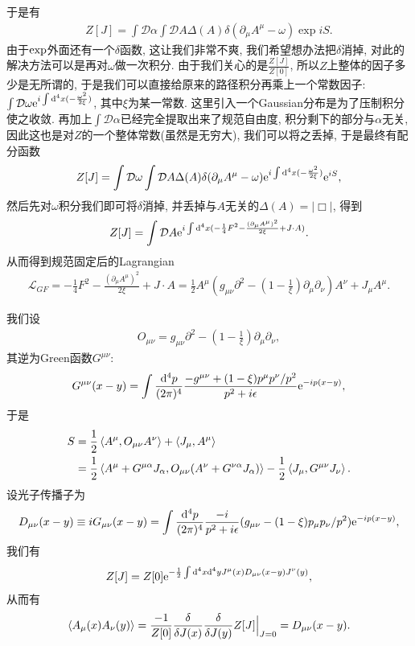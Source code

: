 于是有
\begin{align}
    Z[J]=\int\mathcal D\alpha\int\mathcal DA\Delta(A)\delta(\partial_\mu A^\mu-\omega)\exp{iS}.
\end{align}
由于$\rm{exp}$外面还有一个$\delta$函数, 这让我们非常不爽, 我们希望想办法把$\delta$消掉, 对此的解决方法可以是再对$\omega$做一次积分. 由于我们关心的是$\frac{Z[J]}{Z[0]}$, 所以$Z$上整体的因子多少是无所谓的, 于是我们可以直接给原来的路径积分再乘上一个常数因子: $\int\mathcal D\omega\exp{i\int\d^4x(-\frac{\omega^2}{2\xi})}$, 其中$\xi$为某一常数. 这里引入一个Gaussian分布是为了压制积分使之收敛. 再加上$\int\mathcal D\alpha$已经完全提取出来了规范自由度, 积分剩下的部分与$\alpha$无关, 因此这也是对$Z$的一个整体常数(虽然是无穷大), 我们可以将之丢掉, 于是最终有配分函数
\begin{align}
    Z[J]=\int\mathcal D\omega\int\mathcal DA\Delta(A)\delta(\partial_\mu A^\mu-\omega)\exp{i\int\d^4x(-\frac{\omega^2}{2\xi})}\exp{iS},
\end{align}
然后先对$\omega$积分我们即可将$\delta$消掉, 并丢掉与$A$无关的$\Delta(A)=|\Box|$, 得到
\begin{align}
    Z[J]=\int\mathcal DA\exp{i\int\d^4x(-\frac14 F^2-\frac{(\partial_\mu A^\mu)^2}{2\xi}+J\cdot A)}.
\end{align}
从而得到规范固定后的Lagrangian
\begin{align}
    \mathcal L_{GF}=-\frac14 F^2-\frac{(\partial_\mu A^\mu)^2}{2\xi}+J\cdot A=\frac12 A^\mu(g_{\mu\nu}\partial^2-(1-\frac1\xi)\partial_\mu\partial_\nu)A^\nu+J_\mu A^\mu.
\end{align}

我们设
\begin{align}
    O_{\mu\nu}=g_{\mu\nu}\partial^2-(1-\frac1\xi)\partial_\mu\partial_\nu,
\end{align}
其逆为Green函数$G^{\mu\nu}$:
\begin{align}
    G^{\mu\nu}(x-y)=\int\dddd p\frac{-g^{\mu\nu}+(1-\xi)p^\mu p^\nu/p^2}{p^2+i\epsilon}\exp{-ip(x-y)},
\end{align}
于是
\begin{align}
    S&=\frac12\braket{A^\mu, O_{\mu\nu}A^\nu}+\braket{J_\mu, A^\mu}\\
    &=\frac12\braket{A^\mu+G^{\mu\alpha}J_\alpha, O_{\mu\nu}(A^\nu+G^{\nu\alpha}J_\alpha)}-\frac12\braket{J_\mu, G^{\mu\nu}J_\nu}.
\end{align}
设光子传播子为
\begin{align}
    D_{\mu\nu}(x-y)\equiv iG_{\mu\nu}(x-y)=\int\dddd p\frac{-i}{p^2+i\epsilon}(g_{\mu\nu}-(1-\xi)p_\mu p_\nu/p^2)\exp{-ip(x-y)},
\end{align}
我们有
\begin{align}
    Z[J]=Z[0]\exp{-\frac12\int\d^4x\d^4yJ^\mu(x)D_{\mu\nu}(x-y)J^{\nu}(y)},
\end{align}
从而有
\begin{align}
    \braket{A_\mu(x)A_\nu(y)}=\frac{-1}{Z[0]}\frac{\delta}{\delta J(x)}\frac{\delta}{\delta J(y)}Z[J]\Big|_{J=0}=D_{\mu\nu}(x-y).
\end{align}

